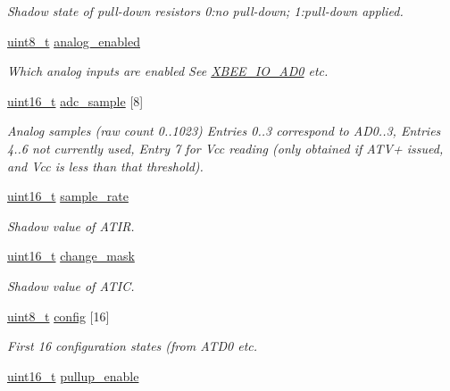 \begin{DoxyCompactItemize}
\begin{DoxyCompactList}\small\item\em Shadow state of pull-\/down resistors 0\-:no pull-\/down; 1\-:pull-\/down applied. \end{DoxyCompactList}\item 
\hyperlink{group__hal_gae1affc9ca37cfb624959c866a73f83c2}{uint8\-\_\-t} \hyperlink{group__xbee__io_ga8473837f97f54ee29f09cd8f9c15e084}{analog\-\_\-enabled}
\begin{DoxyCompactList}\small\item\em Which analog inputs are enabled See \hyperlink{group__xbee__io_gafc56816e62b0dd0a8d981b08f5f29651}{X\-B\-E\-E\-\_\-\-I\-O\-\_\-\-A\-D0} etc. \end{DoxyCompactList}\item 
\hyperlink{group__hal_ga5a8b2dc9e45a9ee81a94ef304fb62505}{uint16\-\_\-t} \hyperlink{group__xbee__io_ga51a638af480039b3c6578b36b5ad44f0}{adc\-\_\-sample} \mbox{[}8\mbox{]}
\begin{DoxyCompactList}\small\item\em Analog samples (raw count 0..1023) Entries 0..3 correspond to A\-D0..3, Entries 4..6 not currently used, Entry 7 for Vcc reading (only obtained if A\-T\-V+ issued, and Vcc is less than that threshold). \end{DoxyCompactList}\item 
\hypertarget{group__xbee__io_ga55f35df829432e5948124c79e1cda4d9}{\hyperlink{group__hal_ga5a8b2dc9e45a9ee81a94ef304fb62505}{uint16\-\_\-t} \hyperlink{group__xbee__io_ga55f35df829432e5948124c79e1cda4d9}{sample\-\_\-rate}}\label{group__xbee__io_ga55f35df829432e5948124c79e1cda4d9}

\begin{DoxyCompactList}\small\item\em Shadow value of A\-T\-I\-R. \end{DoxyCompactList}\item 
\hypertarget{group__xbee__io_ga2502e2e5a62801d202ac0cb63e546e46}{\hyperlink{group__hal_ga5a8b2dc9e45a9ee81a94ef304fb62505}{uint16\-\_\-t} \hyperlink{group__xbee__io_ga2502e2e5a62801d202ac0cb63e546e46}{change\-\_\-mask}}\label{group__xbee__io_ga2502e2e5a62801d202ac0cb63e546e46}

\begin{DoxyCompactList}\small\item\em Shadow value of A\-T\-I\-C. \end{DoxyCompactList}\item 
\hyperlink{group__hal_gae1affc9ca37cfb624959c866a73f83c2}{uint8\-\_\-t} \hyperlink{group__xbee__io_ga46d8dea1f8c2a731faf0db27d6ed308f}{config} \mbox{[}16\mbox{]}
\begin{DoxyCompactList}\small\item\em First 16 configuration states (from A\-T\-D0 etc. \end{DoxyCompactList}\item 
\hypertarget{group__xbee__io_ga059172dae4cbb97d22755682ec824079}{\hyperlink{group__hal_ga5a8b2dc9e45a9ee81a94ef304fb62505}{uint16\-\_\-t} \hyperlink{group__xbee__io_ga059172dae4cbb97d22755682ec824079}{pullup\-\_\-enable}}\label{group__xbee__io_ga059172dae4cbb97d22755682ec824079}


\end{DoxyCompactItemize}
